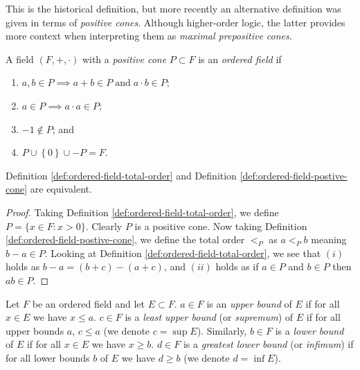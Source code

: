 This is the historical definition, but more recently an alternative definition
was given in terms of \emph{positive cones}.
Although higher-order logic, the latter provides more context when interpreting
them as \emph{maximal prepositive cones}.

\begin{definition}
	\label{def:ordered-field-postive-cone}
	A field $(F, +, \cdot)$ with a \emph{positive cone} $P \subset F$
	is an \emph{ordered field} if
	\begin{enumerate}
		\item $a,b \in P \implies a + b \in P \;\text{and}\; a \cdot b \in P$;
		\item $a \in P \implies a \cdot a \in P$;
		\item $-1 \not\in P$; and
		\item $P \cup \left\{ 0 \right\} \cup -P = F$.
	\end{enumerate}
\end{definition}

\begin{proposition}[]
	Definition \ref{def:ordered-field-total-order} 
	and Definition \ref{def:ordered-field-postive-cone}
	are equivalent.
\end{proposition}

\begin{proof}
	Taking Definition \ref{def:ordered-field-total-order},
	we define $P = \{x \in F : x > 0\}$.
	Clearly $P$ is a positive cone.
	Now taking Definition \ref{def:ordered-field-postive-cone},
	we define the total order $<_P$ as $a <_P b$ meaning
	$b - a \in P$.
	Looking at Definition \ref{def:ordered-field-total-order}, 
	we see that $(i)$ holds as $b - a = (b + c) - (a + c)$,
	and $(ii)$ holds as if $a \in P$ and $b \in P$ then $ab \in P$.
\end{proof}

\begin{definition}
	Let $F$ be an ordered field and let $E \subset F$.
	$a \in F$ is an \emph{upper bound} of $E$ if for all $x \in E$
	we have $x \leq a$. $c \in F$ is a \emph{least upper bound} 
	(or \emph{supremum}) of $E$ if for all upper bounds $a$,
	$c \leq a$ (we denote $c = \sup E$).
	Similarly, $b \in F$ is a \emph{lower bound}  of $E$ if for all 
	$x \in E$ we have $x \geq b$. $d \in F$ is a \emph{greatest lower
	bound} (or \emph{infimum}) if for all lower bounds $b$ of $E$ we have 
	$d \geq b$ (we denote $d = \inf E$).
\end{definition}

